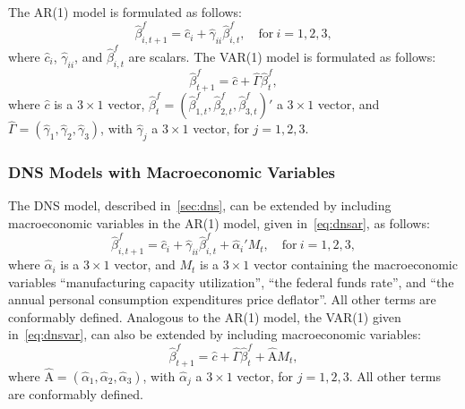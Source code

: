 The AR(1) model is formulated as follows:
\begin{equation}
\label{eq:dnsar}
	\hat{\beta}_{i,t+1}^{f} = \hat{c}_i + \hat{\gamma}_{ii} \hat{\beta}_{i,t}^f, \quad \text{for}~i = 1,2,3,
\end{equation}
where $\hat{c}_i$, $\hat{\gamma}_{ii}$, and $\hat{\beta}_{i,t}^f$ are scalars. 
The VAR(1) model is formulated as follows:
\begin{equation}
\label{eq:dnsvar}
	\hat{\beta}_{t+1}^{f} = \hat{c} + \hat{\Gamma} \hat{\beta}_t^f,
\end{equation}
where $\hat{c}$ is a $3 \times 1$ vector, $\hat{\beta}_t^f = \left(\hat{\beta}_{1,t}^f, \hat{\beta}_{2,t}^f, \hat{\beta}_{3,t}^f\right)'$ a $3 \times 1$ vector, and $\hat{\Gamma} = \left(\hat{\gamma}_1, \hat{\gamma}_2, \hat{\gamma}_3 \right)$, with $\hat{\gamma}_j$ a $3 \times 1$ vector, for $j = 1,2,3$. 

\subsubsection{DNS Models with Macroeconomic Variables}
\label{sec:dnsmv}
The DNS model, described in~\cref{sec:dns}, can be extended by including macroeconomic variables in the AR(1) model, given in~\cref{eq:dnsar}, as follows:
\begin{equation}
	\hat{\beta}_{i,t+1}^{f} = \hat{c}_i + \hat{\gamma}_{ii} \hat{\beta}_{i,t}^f + \hat{\alpha}_i' M_t, \quad \text{for}~i = 1,2,3,
\end{equation}
where $\hat{\alpha}_i$ is a $3 \times 1$ vector, and $M_t$ is a $3 \times 1$ vector containing the macroeconomic variables \enquote{manufacturing capacity utilization}, \enquote{the federal funds rate}, and \enquote{the annual personal consumption expenditures price deflator}. 
All other terms are conformably defined. 
Analogous to the AR(1) model, the VAR(1) given in~\cref{eq:dnsvar}, can also be extended by including macroeconomic variables:
\begin{equation}
	\hat{\beta}_{t+1}^{f} = \hat{c} + \hat{\Gamma} \hat{\beta}_t^f + \hat{\mathrm{A}} M_t,
\end{equation}
where $\hat{\mathrm{A}} = \left(\hat{\alpha}_1, \hat{\alpha}_2, \hat{\alpha}_3 \right)$, with $\hat{\alpha}_j$ a $3 \times 1$ vector, for $j = 1,2,3$. 
All other terms are conformably defined.

